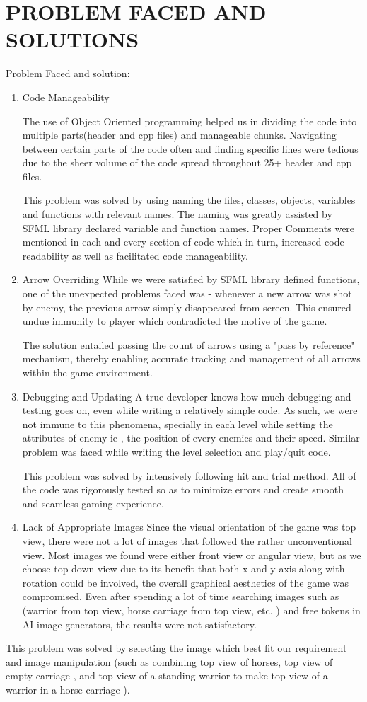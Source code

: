 \section{PROBLEM FACED AND SOLUTIONS}
Problem Faced and solution:

\begin{enumerate}
	\item Code Manageability
	
	The use of Object Oriented programming helped us in dividing the code into multiple parts(header and cpp files) and manageable chunks. Navigating between certain parts of the code often and finding specific lines were tedious due to the sheer volume of the code spread throughout 25+ header and cpp files.
	
	This problem was solved by using naming the files, classes, objects, variables and functions with relevant names. The naming was greatly assisted by SFML library declared variable and function names. Proper Comments were mentioned in each and every section of code which in turn, increased code readability as well as facilitated code manageability.
	
	
	\item  Arrow Overriding
	While we were satisfied by SFML library defined functions, one of the unexpected problems faced was - whenever a new arrow was shot by enemy, the previous arrow simply disappeared from screen. This ensured undue immunity to player which contradicted the motive of the game.
	
	The solution entailed passing the count of arrows using a "pass by reference" mechanism, thereby enabling accurate tracking and management of all arrows within the game environment.
		
	\item Debugging and Updating
	A true developer knows how much debugging and testing goes on, even while writing a relatively simple code. As such, we were not immune to this phenomena, specially in each level while setting the attributes of  enemy ie , the position of every enemies and their speed. Similar problem was faced while writing the level selection and play/quit code.
	
	This problem was solved by intensively following hit and trial method. All of the code was rigorously tested so as to minimize errors and create smooth and seamless gaming experience.
	
	\item Lack of Appropriate Images
	Since the visual orientation of the game was top view, there were not a lot of images that followed the rather unconventional view. Most images we found were either front view or angular view, but as we choose top down view due to its benefit that both x and y axis along with rotation could be involved, the overall graphical aesthetics of the game was compromised. Even after spending a lot of time searching images such as (warrior from top view, horse carriage from top view, etc. ) and free tokens in AI image generators, the results were not satisfactory.
		
\end{enumerate}



This problem was solved by selecting the image which best fit our requirement and image manipulation (such as combining top view of horses, top view of empty carriage , and top view of a standing warrior to make top view of a warrior in a horse carriage ). 
\newpage